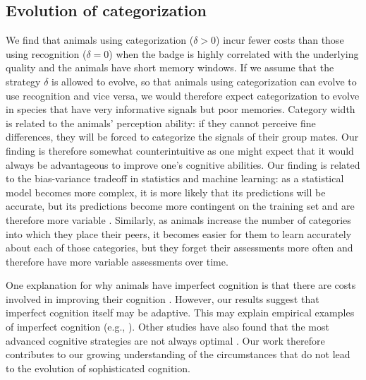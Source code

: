 \subsection*{Evolution of categorization }

We find that animals using categorization ($\delta>0$) incur fewer costs than those using recognition ($\delta=0$) when the badge is highly correlated with the underlying quality and the animals have short memory windows. If we assume that the strategy $\delta$ is allowed to evolve, so that animals using categorization can evolve to use recognition and vice versa, we would therefore expect categorization to evolve in species that have very informative signals but poor memories. Category width is related to the animals' perception ability: if they cannot perceive fine differences, they will be forced to categorize the signals of their group mates. Our finding is therefore somewhat counterintuitive as one might expect that it would always be advantageous to improve one's cognitive abilities. Our finding is related to the bias-variance tradeoff in statistics and machine learning: as a statistical model becomes more complex, it is more likely that its predictions will be accurate, but its predictions become more contingent on the training set and are therefore more variable \citep{Domingos:2000cr,Briscoe:2011nx}. Similarly, as animals increase the number of categories into which they place their peers, it becomes easier for them to learn accurately about each of those categories, but they forget their assessments more often and therefore have more variable assessments over time. %

One explanation for why animals have imperfect cognition is that there are costs involved in improving their cognition \citep{Dunbar:1992ys,Laughlin:1998ly,Laughlin:2001qf,Gavrilets:2006fk,MacIver:2010ve}. However, our results suggest that imperfect cognition itself may be adaptive. This may explain empirical examples of imperfect cognition (e.g., \citep{Kikuchi:2010ys}). Other studies have also found that the most advanced cognitive strategies are not always optimal \citep{Stephens:1991fk,Kerr:2003vn,Dunlap:2009vn}. Our work therefore contributes to our growing understanding of the circumstances that do not lead to the evolution of sophisticated cognition.

